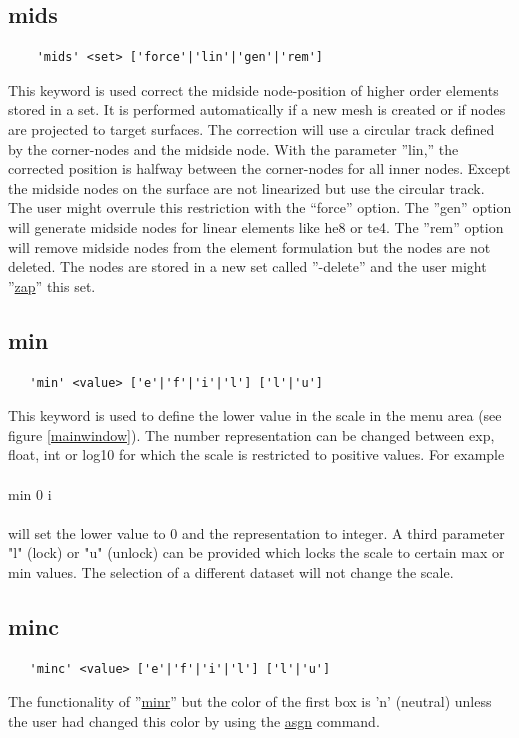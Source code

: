 \documentclass{article}
\providecommand{\htmlref}[2]{\hyperref[#2]{#1}}
\begin{document}
\subsection{\label{mids}mids}
\begin{verbatim}
    'mids' <set> ['force'|'lin'|'gen'|'rem']
\end{verbatim}
This keyword is used correct the midside node-position of higher order elements stored in a set. It is performed automatically if a new mesh is created or if nodes are projected to target surfaces. The correction will use a circular track defined by the corner-nodes and the midside node. With the parameter ''lin,'' the corrected position is halfway between the corner-nodes for all inner nodes. Except the midside nodes on the surface are not linearized but use the circular track. The user might overrule this restriction with the ``force'' option. The ''gen'' option will generate midside nodes for linear elements like he8 or te4. The ''rem'' option will remove midside nodes from the element formulation but the nodes are not deleted. The nodes are stored in a new set called ''-delete'' and the user might ''\htmlref{zap}{zap}'' this set. 

\subsection{\label{min}min}
\begin{verbatim}
   'min' <value> ['e'|'f'|'i'|'l'] ['l'|'u']
\end{verbatim}
This keyword is used to define the lower value in the scale in the menu area (see figure \ref{mainwindow}). The number representation can be changed between exp, float, int or log10 for which the scale is restricted to positive values. For example\\\\min 0 i\\\\will set the lower value to 0 and the representation to integer. A third parameter "l" (lock) or "u" (unlock) can be provided which locks the scale to certain max or min values. The selection of a different dataset will not change the scale.
 
\subsection{\label{minc}minc}
\begin{verbatim}
   'minc' <value> ['e'|'f'|'i'|'l'] ['l'|'u']
\end{verbatim}
The functionality of ''\htmlref{minr}{minr}'' but the color of the first box is 'n' (neutral) unless the user had changed this color by using the \htmlref{asgn}{asgn} command.
\end{document}
